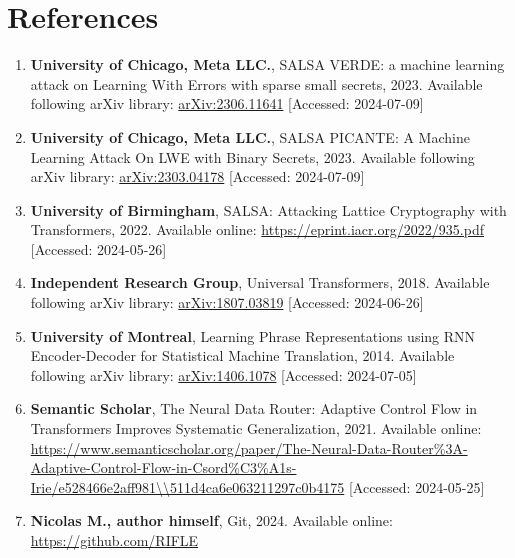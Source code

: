 \documentclass{article}
\begin{document}
\section*{References}
\begin{enumerate}
    \item \textbf{University of Chicago, Meta LLC.}, SALSA VERDE: a machine learning attack on Learning With Errors with sparse small secrets, 2023. Available following arXiv library: \url{arXiv:2306.11641} [Accessed: 2024-07-09]
    \item \textbf{University of Chicago, Meta LLC.}, SALSA PICANTE: A Machine Learning Attack On LWE with Binary Secrets, 2023. Available following arXiv library: \url{arXiv:2303.04178} [Accessed: 2024-07-09]
    \item \textbf{University of Birmingham}, SALSA: Attacking Lattice Cryptography with Transformers, 2022. Available online: \url{https://eprint.iacr.org/2022/935.pdf} [Accessed: 2024-05-26]
    \item \textbf{Independent Research Group}, Universal Transformers, 2018. Available following arXiv library: \url{arXiv:1807.03819} [Accessed: 2024-06-26]
    \item \textbf{University of Montreal}, Learning Phrase Representations using RNN Encoder-Decoder for Statistical Machine Translation, 2014. Available following arXiv library: \url{arXiv:1406.1078} [Accessed: 2024-07-05]
    \item \textbf{Semantic Scholar}, The Neural Data Router: Adaptive Control Flow in Transformers Improves Systematic Generalization, 2021. Available online: \url{https://www.semanticscholar.org/paper/The-Neural-Data-Router%3A-Adaptive-Control-Flow-in-Csord%C3%A1s-Irie/e528466e2aff981\\511d4ca6e063211297c0b4175} [Accessed: 2024-05-25]
    \item \textbf{Nicolas M., author himself}, Git, 2024. Available online: \url{https://github.com/RIFLE}
\end{enumerate}
\end{document}
